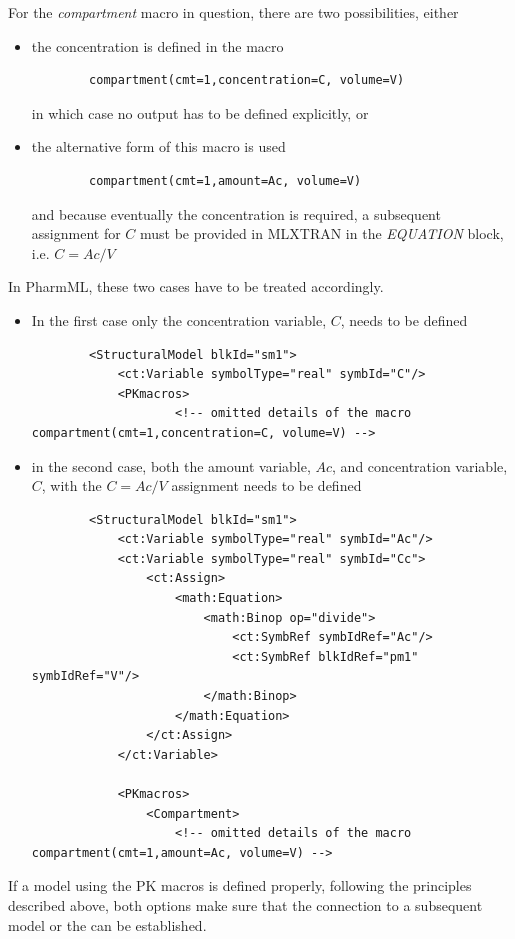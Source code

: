 For the \emph{compartment} macro in question, there are two possibilities, either
\begin{itemize}
\item
the concentration is defined in the macro
\lstset{language=NONMEMdataSet}
\begin{lstlisting}
		compartment(cmt=1,concentration=C, volume=V)
\end{lstlisting}
in which case no output has to be defined explicitly, or
\item
the alternative form of this macro is used
\lstset{language=NONMEMdataSet}
\begin{lstlisting}
		compartment(cmt=1,amount=Ac, volume=V)
\end{lstlisting}
and because eventually the concentration is required, a subsequent assignment for $C$ must be provided in MLXTRAN
in the \emph{EQUATION} block, i.e. $C = Ac/V$
\end{itemize}
In PharmML, these two cases have to be treated accordingly. 
\begin{itemize}
\item
In the first case only the concentration variable, $C$, needs to be defined
\lstset{language=XML}
\begin{lstlisting}
        <StructuralModel blkId="sm1">
            <ct:Variable symbolType="real" symbId="C"/>
            <PKmacros>
                    <!-- omitted details of the macro compartment(cmt=1,concentration=C, volume=V) -->
\end{lstlisting}
\item
in the second case, both the amount variable, $Ac$, and concentration variable, $C$, 
with the $C=Ac/V$ assignment needs to be defined
\lstset{language=XML}
\begin{lstlisting}
        <StructuralModel blkId="sm1">
            <ct:Variable symbolType="real" symbId="Ac"/>
            <ct:Variable symbolType="real" symbId="Cc">
                <ct:Assign>
                    <math:Equation>
                        <math:Binop op="divide">
                            <ct:SymbRef symbIdRef="Ac"/>
                            <ct:SymbRef blkIdRef="pm1" symbIdRef="V"/>
                        </math:Binop>
                    </math:Equation>
                </ct:Assign>
            </ct:Variable>
            
            <PKmacros>
                <Compartment>
                    <!-- omitted details of the macro compartment(cmt=1,amount=Ac, volume=V) -->
\end{lstlisting}
\end{itemize}
If a model using the PK macros is defined properly, following the principles described above, 
both options make sure that the connection to a subsequent model or the  
can be established.



